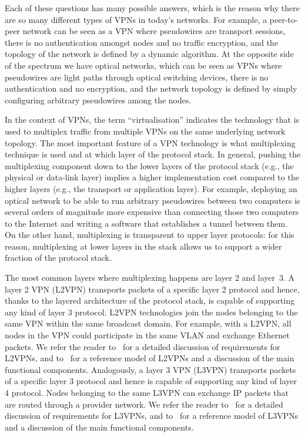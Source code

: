 \documentclass{article}
\begin{document}
Each of these questions has many possible answers, which is the reason why there 
are so many different types of VPNs in today's networks. For example, a 
peer-to-peer network can be seen as a VPN where pseudowires are transport 
sessions, there is no authentication amongst nodes and no traffic encryption, 
and the topology of the network is defined by a dynamic algorithm. At the 
opposite side of the spectrum we have optical networks, which can be seen as 
VPNs where pseudowires are light paths through optical switching devices, there 
is no authentication and no encryption, and the network topology is defined by 
simply configuring arbitrary pseudowires among the nodes.

In the context of VPNs, the term ``virtualisation'' indicates the technology 
that is used to multiplex traffic from multiple VPNs on the same underlying 
network topology. The most important feature of a VPN technology is what 
multiplexing technique is used and at which layer of the protocol stack. In 
general, pushing the multiplexing component down to the lower layers of the 
protocol stack (e.g., the physical or data-link layer) implies a higher 
implementation cost compared to the higher layers (e.g., the transport or 
application layer). For example, deploying an optical network to be able to run 
arbitrary pseudowires between two computers is several orders of magnitude more 
expensive than connecting those two computers to the Internet and writing a 
software that establishes a tunnel between them. On the other hand, 
multiplexing is transparent to upper layer protocols: for this reason, 
multiplexing at lower layers in the stack allows us to support a wider fraction 
of the protocol stack. 

The most common layers where multiplexing happens are layer 2 and layer~3. 
A layer 2 VPN (L2VPN) transports packets of a specific layer 2 protocol and 
hence, thanks to the layered architecture of the protocol stack, is capable of 
supporting any kind of layer 3 protocol. L2VPN technologies join the nodes 
belonging to the same VPN within the same broadcast domain. For example, with a 
L2VPN, all nodes in the VPN could participate in the same VLAN and exchange 
Ethernet packets. We refer the reader to~\cite{rfc4665} for a detailed 
discussion of requirements for L2VPNs, and to~\cite{rfc4664} for a reference 
model of L2VPNs and a discussion of the main functional components.
%
Analogously, a layer 3 VPN (L3VPN) transports packets of a specific layer 3 
protocol and hence is capable of supporting any kind of layer 4 protocol. Nodes 
belonging to the same L3VPN can exchange IP packets that are routed through a 
provider network. We refer the reader to~\cite{rfc4031} for a detailed 
discussion of requirements for L3VPNs, and to~\cite{rfc4110} for a reference 
model of L3VPNs and a discussion of the main functional components.
\end{document}
